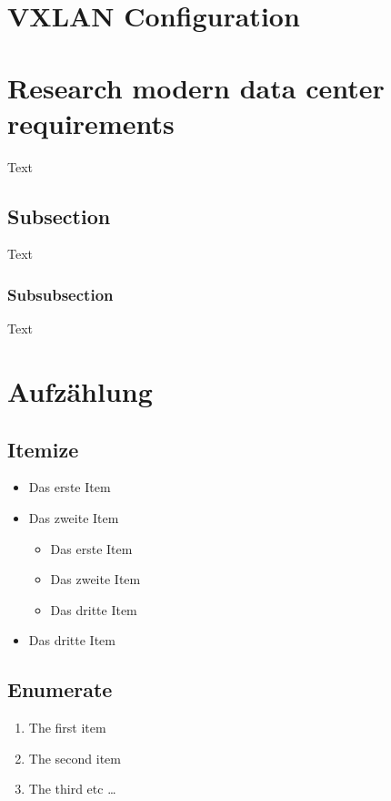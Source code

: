 \documentclass[a4,12pt]{scrartcl}
\begin{document}
\section{VXLAN Configuration}
\section{Research modern data center requirements}
Text


\subsection{Subsection}
Text


\subsubsection{Subsubsection}
Text

\section{Aufzählung}
\subsection{Itemize}
\begin{itemize}
\item Das erste Item
\item Das zweite Item
\begin{itemize}
\item Das erste Item
\item Das zweite Item
\item Das dritte Item
\end{itemize}
\item Das dritte Item
\end{itemize}

\subsection{Enumerate}
\begin{enumerate}
  \item The first item
  \item The second item
  \item The third etc \ldots
\end{enumerate}
\end{document}
